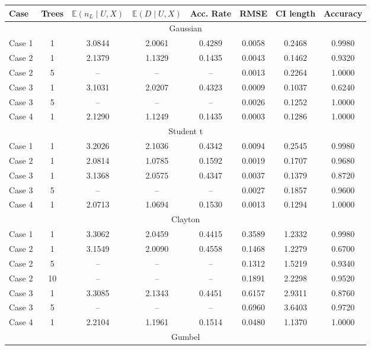 \documentclass{amsart}
\begin{document}
\begin{table}[ht]
	\centering
	\scriptsize{
	\begin{tabular}{lc|cccccc}
		\toprule
		Case & Trees & $\mathbb{E}(n_L\mid U,X)$ & $\mathbb{E}(D\mid U,X)$ & Acc. Rate & RMSE & CI length & Accuracy \\ 
		\midrule
		\multicolumn{8}{c}{Gaussian} \\
		\midrule
		Case 1 & 1 & 3.0844 & 2.0061 & 0.4289 & 0.0058 & 0.2468 & 0.9980 \\ 
		Case 2 & 1 & 2.1379 & 1.1329 & 0.1435 & 0.0043 & 0.1462 & 0.9320 \\ 
		Case 2 & 5 & -- & -- & -- & 0.0013 & 0.2264 & 1.0000  \\ 
		Case 3 & 1 & 3.1031 & 2.0207 & 0.4323 & 0.0009 & 0.1037 & 0.6240 \\
		Case 3 & 5 & -- & -- & -- & 0.0026 & 0.1252 & 1.0000 \\ 
		Case 4 & 1 & 2.1290 & 1.1249 & 0.1435 & 0.0003 & 0.1286 & 1.0000 \\ 
		\midrule
		\multicolumn{8}{c}{Student t} \\
		\midrule
		Case 1 & 1 & 3.2026 & 2.1036 & 0.4342 & 0.0094 & 0.2545 & 0.9980 \\ 
		Case 2 & 1 & 2.0814 & 1.0785 & 0.1592 & 0.0019 & 0.1707 & 0.9680 \\ 
		Case 3 & 1 & 3.1368 & 2.0575 & 0.4347 & 0.0037 & 0.1379 & 0.8720 \\ 
		Case 3 & 5 & -- & -- & -- & 0.0027 & 0.1857 & 0.9600 \\
		Case 4 & 1 & 2.0713 & 1.0694 & 0.1530 & 0.0013 & 0.1294 & 1.0000 \\ 
		\midrule
		\multicolumn{8}{c}{Clayton} \\
		\midrule
		Case 1 & 1 & 3.3062 & 2.0459 & 0.4415 & 0.3589 & 1.2332 & 0.9980 \\ 
		Case 2 & 1 & 3.1549 & 2.0090 & 0.4558 & 0.1468 & 1.2279 & 0.6700 \\ 
		Case 2 & 5 & -- & -- & -- & 0.1312 & 1.5219 & 0.9340 \\ 
		Case 2 & 10 & -- & -- & -- & 0.1891 & 2.2298 & 0.9520 \\ 
		Case 3 & 1 & 3.3085 & 2.1343 & 0.4451 & 0.6157 & 2.9311 & 0.8760 \\ 
		Case 3 & 5 & -- & -- & -- & 0.6960 & 3.6403 & 0.9720 \\ 
		Case 4 & 1 & 2.2104 & 1.1961 & 0.1514 & 0.0480 & 1.1370 & 1.0000 \\
		\midrule
		\multicolumn{8}{c}{Gumbel} \\

\end{tabular}}
\end{table}
\end{document}
